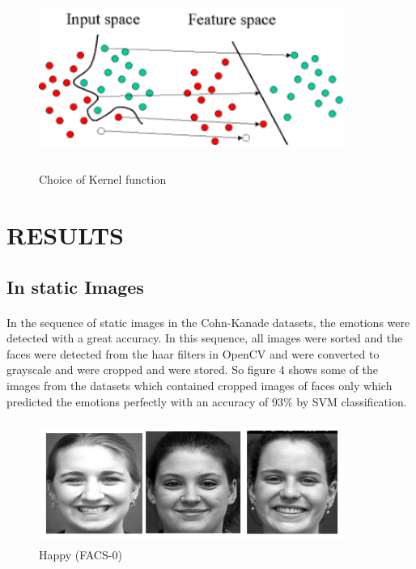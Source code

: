 \documentclass[a4paper,12pt,oneside]{article}
\begin{document}
\hfill \break
\hfill \break
\begin{figure}[H]
\centering
\includegraphics[height=6cm,width=10cm]{download.jpg}
\caption{Choice of Kernel function}
\end{figure}




\newpage
\section{RESULTS}
\subsection{In static Images}
\paragraph{}
In the sequence of static images in the Cohn-Kanade
datasets, the emotions were detected with a great
accuracy. In this sequence, all images were sorted and
the faces were detected from the haar filters in OpenCV
and were converted to grayscale and were cropped and
were stored. So figure 4 shows some of the images from
the datasets which contained cropped images of faces
only which predicted the emotions perfectly with an
accuracy of 93\% by SVM classification.





\begin{figure}[H]
\centering

\includegraphics[height=4cm,width=10cm]{happy.jpg}

\caption{Happy (FACS-0)}
\end{figure}
\end{document}
